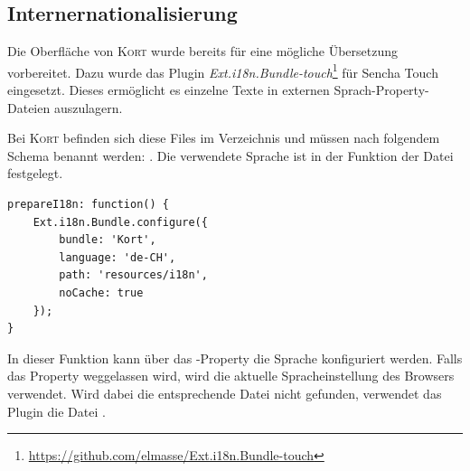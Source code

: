 \subsection{Internernationalisierung}
\label{i18n}
Die Oberfläche von \textsc{Kort} wurde bereits für eine mögliche Übersetzung vorbereitet.
Dazu wurde das Plugin \emph{Ext.i18n.Bundle-touch}\footnote{\url{https://github.com/elmasse/Ext.i18n.Bundle-touch}} für Sencha Touch eingesetzt.
Dieses ermöglicht es einzelne Texte in externen Sprach-Property-Dateien auszulagern.

Bei \textsc{Kort} befinden sich diese Files im Verzeichnis  und müssen nach folgendem Schema benannt werden: .
Die verwendete Sprache ist in der Funktion  der Datei  festgelegt.

\lstset{language=JavaScript}
\begin{lstlisting}[caption=kort - Sprache definieren, label=kort-choose-language]
prepareI18n: function() {
	Ext.i18n.Bundle.configure({
		bundle: 'Kort',
		language: 'de-CH',
		path: 'resources/i18n',
		noCache: true
	});
}
\end{lstlisting}

In dieser Funktion kann über das -Property die Sprache konfiguriert werden.
Falls das Property weggelassen wird, wird die aktuelle Spracheinstellung des Browsers verwendet.
Wird dabei die entsprechende Datei nicht gefunden, verwendet das Plugin die Datei .